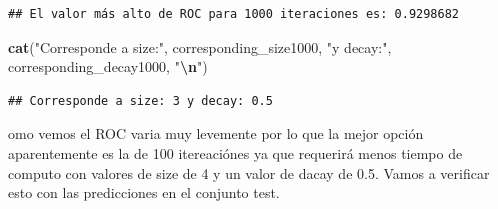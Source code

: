 \documentclass[
]{article}
\newenvironment{Shaded}{\begin{snugshade}}{\end{snugshade}}
\newcommand{\CommentTok}[1]{\textcolor[rgb]{0.56,0.35,0.01}{\textit{#1}}}
\newcommand{\FloatTok}[1]{\textcolor[rgb]{0.00,0.00,0.81}{#1}}
\newcommand{\FunctionTok}[1]{\textcolor[rgb]{0.13,0.29,0.53}{\textbf{#1}}}
\newcommand{\NormalTok}[1]{#1}
\newcommand{\OtherTok}[1]{\textcolor[rgb]{0.56,0.35,0.01}{#1}}
\newcommand{\SpecialCharTok}[1]{\textcolor[rgb]{0.81,0.36,0.00}{\textbf{#1}}}
\newcommand{\StringTok}[1]{\textcolor[rgb]{0.31,0.60,0.02}{#1}}
\begin{document}
\begin{Shaded}
\end{Shaded}

\begin{verbatim}
## El valor más alto de ROC para 1000 iteraciones es: 0.9298682
\end{verbatim}

\begin{Shaded}
\begin{Highlighting}[]
\FunctionTok{cat}\NormalTok{(}\StringTok{"Corresponde a size:"}\NormalTok{, corresponding\_size1000, }\StringTok{"y decay:"}\NormalTok{, corresponding\_decay1000, }\StringTok{"}\SpecialCharTok{\textbackslash{}n}\StringTok{"}\NormalTok{)}
\end{Highlighting}
\end{Shaded}

\begin{verbatim}
## Corresponde a size: 3 y decay: 0.5
\end{verbatim}

omo vemos el ROC varia muy levemente por lo que la mejor opción
aparentemente es la de 100 itereaciónes ya que requerirá menos tiempo de
computo con valores de size de 4 y un valor de dacay de 0.5. Vamos a
verificar esto con las predicciones en el conjunto test.
\end{document}
